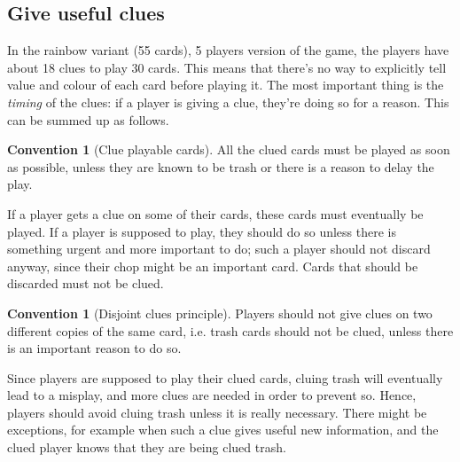 \documentclass[a4paper]{article}
\theoremstyle{plain}
\theoremstyle{definition}
\newtheorem{convention}[theorem]{Convention}
\begin{document}
\subsection{Give useful clues}

In the rainbow variant (55 cards), 5 players version of the game, the players have about 18 clues to play 30 cards. This means that there's no way to explicitly tell value and colour of each card before playing it. The most important thing is the \textit{timing} of the clues: if a player is giving a clue, they're doing so for a reason. This can be summed up as follows.

\begin{convention}[Clue playable cards]
	\label{clue-playable-cards}
	All the clued cards must be played as soon as possible, unless they are known to be trash or there is a reason to delay the play.
\end{convention}

If a player gets a clue on some of their cards, these cards must eventually be played. If a player is supposed to play, they should do so unless there is something urgent and more important to do; such a player should not discard anyway, since their chop might be an important card. Cards that should be discarded must not be clued.

\begin{convention}[Disjoint clues principle]
	\label{disjoint-clues}
	Players should not give clues on two different copies of the same card, i.e. trash cards should not be clued, unless there is an important reason to do so.
\end{convention}

Since players are supposed to play their clued cards, cluing trash will eventually lead to a misplay, and more clues are needed in order to prevent so. Hence, players should avoid cluing trash unless it is really necessary. There might be exceptions, for example when such a clue gives useful new information, and the clued player knows that they are being clued trash.
\end{document}
